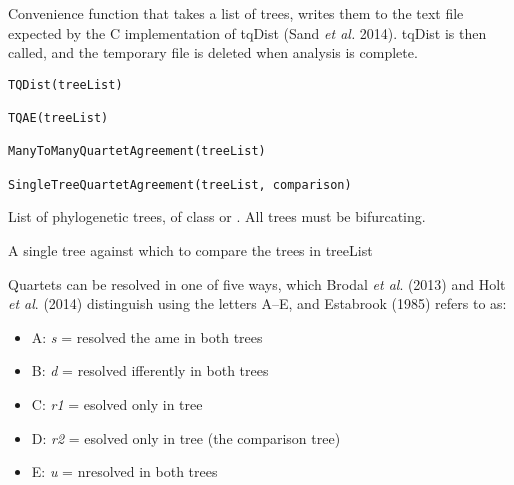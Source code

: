 \documentclass[a4paper]{book}
\begin{document}
%
\begin{Description}\relax
Convenience function that takes a list of trees, writes them to the text file
expected by the C implementation of tqDist (Sand \emph{et al.} 2014).
tqDist is then called, and the temporary file is deleted when analysis is complete.
\end{Description}
%
\begin{Usage}
\begin{verbatim}
TQDist(treeList)

TQAE(treeList)

ManyToManyQuartetAgreement(treeList)

SingleTreeQuartetAgreement(treeList, comparison)
\end{verbatim}
\end{Usage}
%
\begin{Arguments}
\begin{ldescription}
\item[\code{treeList}] List of phylogenetic trees, of class  or
. All trees must be bifurcating.

\item[\code{comparison}] A single tree against which to compare the trees in treeList
\end{ldescription}
\end{Arguments}
%
\begin{Details}\relax
Quartets can be resolved in one of five ways, which
Brodal \emph{et al}. (2013) and Holt \emph{et al}. (2014) distinguish using the letters
A--E, and Estabrook (1985) refers to as:
\begin{itemize}

\item A: \emph{s} = resolved the ame in both trees
\item B: \emph{d} = resolved ifferently in both trees
\item C: \emph{r1} = esolved only in tree 
\item D: \emph{r2} = esolved only in tree  (the comparison tree)
\item E: \emph{u} = nresolved in both trees

\end{itemize}

\end{Details}
\end{document}
